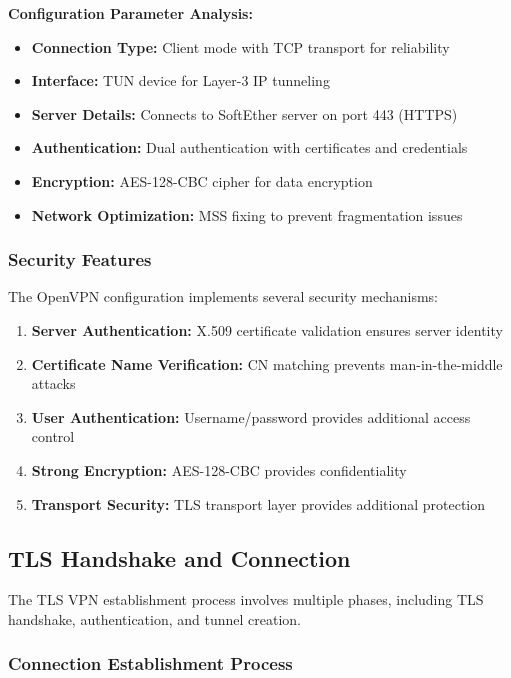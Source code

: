 \noindent
\textbf{Configuration Parameter Analysis:}

\begin{itemize}
    \item \textbf{Connection Type:} Client mode with TCP transport for reliability
    \item \textbf{Interface:} TUN device for Layer-3 IP tunneling
    \item \textbf{Server Details:} Connects to SoftEther server on port 443 (HTTPS)
    \item \textbf{Authentication:} Dual authentication with certificates and credentials
    \item \textbf{Encryption:} AES-128-CBC cipher for data encryption
    \item \textbf{Network Optimization:} MSS fixing to prevent fragmentation issues
\end{itemize}

\subsubsection{Security Features}

The OpenVPN configuration implements several security mechanisms:

\begin{enumerate}
    \item \textbf{Server Authentication:} X.509 certificate validation ensures server identity
    \item \textbf{Certificate Name Verification:} CN matching prevents man-in-the-middle attacks
    \item \textbf{User Authentication:} Username/password provides additional access control
    \item \textbf{Strong Encryption:} AES-128-CBC provides confidentiality
    \item \textbf{Transport Security:} TLS transport layer provides additional protection
\end{enumerate}

\subsection{TLS Handshake and Connection}

The TLS VPN establishment process involves multiple phases, including TLS handshake, authentication, and tunnel creation.

\subsubsection{Connection Establishment Process}

